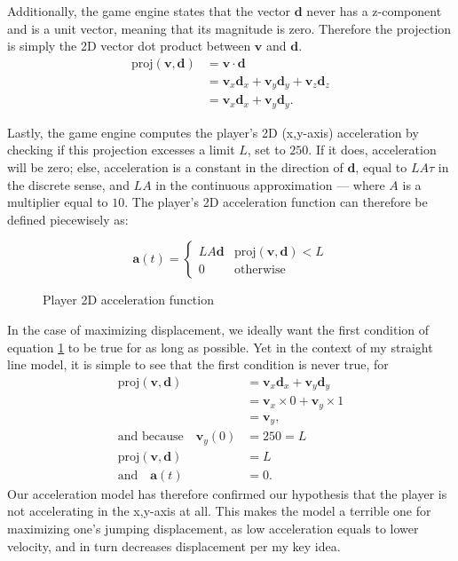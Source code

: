 \documentclass[a4paper,12pt]{article}
\newcommand{\tvec}[1]{\boldsymbol{#1}}
\newcommand{\td}{\tvec{d}}
\newcommand{\ta}{\tvec{a}}
\newcommand{\tv}{\tvec{v}}
\begin{document}
Additionally, the game engine states that the vector $\td$ never has a z-component and is a unit vector, meaning that its magnitude is zero. Therefore the projection is simply the 2D vector dot product between $\tv$ and $\td$.
\begin{align*}
    \text{proj}(\tv, \td) &= \tv \cdot \td\\
    &= \tv_x \td_x + \tv_y \td_y + \tv_z \td_z\\
    &= \tv_x \td_x + \tv_y \td_y.
\end{align*}

Lastly, the game engine computes the player's 2D (x,y-axis) acceleration by checking if this projection excesses a limit $L$, set to $250$. If it does, acceleration will be zero; else, acceleration is a constant in the direction of $\td$, equal to $LA\tau$ in the discrete sense, and $LA$ in the continuous approximation --- where $A$ is a multiplier equal to $10$. The player's 2D acceleration function can therefore be defined piecewisely as:
\begin{figure}[H]
    \centering
    \[
        \ta(t) = \begin{cases}
            LA \td & \text{proj}(\tv, \td) < L\\
            0 & \text{otherwise}
        \end{cases}
    \]
        \caption{Player 2D acceleration function}
    \label{eq:playeracceleration}

\end{figure}

In the case of maximizing displacement, we ideally want the first condition of equation \ref{eq:playeracceleration} to be true for as long as possible. Yet in the context of my straight line model, it is simple to see that the first condition is never true, for
\begin{align*}
    \text{proj}(\tv, \td) &= \tv_x \td_x + \tv_y \td_y\\
    &= \tv_x \times 0 + \tv_y \times 1\\
    &= \tv_y,\\
    \text{and because} \quad \tv_{y}(0) &= 250 = L\\
    \text{proj}(\tv, \td) &= L\\
    \text{and} \quad \ta(t) &= 0.
\end{align*}
Our acceleration model has therefore confirmed our hypothesis that the player is not accelerating in the x,y-axis at all. This makes the model a terrible one for maximizing one's jumping displacement, as low acceleration equals to lower velocity, and in turn decreases displacement per my key idea.
\end{document}
